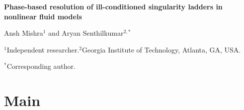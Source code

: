 \documentclass[11pt]{article}
\begin{document}
\linenumbers
\onehalfspacing

\begin{center}
{\LARGE\bfseries Phase-based resolution of ill-conditioned singularity ladders in nonlinear fluid models\par}
\vspace{1.2em}
{\large Ansh Mishra$^{1}$ and Aryan Senthilkumar$^{2,*}$\par}
\vspace{0.6em}
{\small $^{1}$Independent researcher.\quad $^{2}$Georgia Institute of Technology, Atlanta, GA, USA.\par}
\vspace{0.3em}
{\small $^{*}$Corresponding author.\par}
\end{center}

\vspace{1em}
\begin{abstract}
\noindent Unstable self-similar blow-up profiles of incompressible flow come in hierarchies, but their computable
depth is unknown. Here we show that direct computation meets an exponential precision wall: each profile is a zero of
a smoothness defect that shrinks about tenfold per profile. In incompressible porous-media flow, auditing every error
source reveals an erratic defect floor of $10^{-9}$. Two independent solvers agree to that floor, yet their profile
positions drift apart by five orders of magnitude, and a pre-registered holdout test could not identify the seventh
profile. A resonance phase, a quadrature over $O(1)$-accurate profile data, moves 10 to over 1,000 times less under
the same numerical changes, locates that profile ten times more precisely and predicts the wall through its
imaginary part. A tracking failure that passed residual checks was caught by a geometric invariant and repaired with
an exact scaling. Three deeper profiles are registered as benchmarks.
\end{abstract}

\section*{Main}
\end{document}
